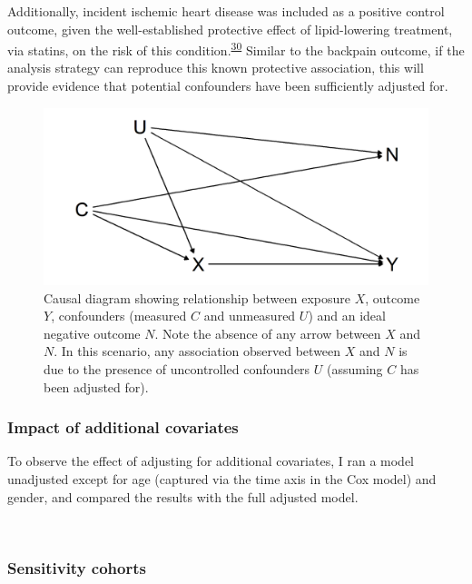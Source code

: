 \documentclass[a4paper, twoside]{templates/ociamthesis}
\begin{document}
Additionally, incident ischemic heart disease was included as a positive control outcome, given the well-established protective effect of lipid-lowering treatment, via statins, on the risk of this condition.\textsuperscript{\protect\hyperlink{ref-collins2016a}{30}} Similar to the backpain outcome, if the analysis strategy can reproduce this known protective association, this will provide evidence that potential confounders have been sufficiently adjusted for.





\begin{figure}[H]
\includegraphics[width=1\linewidth]{figures/cprd-analysis/negativeOutcome} \caption[DAG of ideal negative outcome]{Causal diagram showing relationship between exposure \(X\), outcome \(Y\), confounders (measured \(C\) and unmeasured \(U\)) and an ideal negative outcome \(N\). Note the absence of any arrow between \(X\) and \(N\). In this scenario, any association observed between \(X\) and \(N\) is due to the presence of uncontrolled confounders \(U\) (assuming \(C\) has been adjusted for).}\label{fig:negativeOutcome}
\end{figure}

\hypertarget{impact-of-additional-covariates}{%
\subsubsection{Impact of additional covariates}\label{impact-of-additional-covariates}}

To observe the effect of adjusting for additional covariates, I ran a model unadjusted except for age (captured via the time axis in the Cox model) and gender, and compared the results with the full adjusted model.

~

\hypertarget{sensitivity-cohorts}{%
\subsubsection{Sensitivity cohorts}\label{sensitivity-cohorts}}
\end{document}

